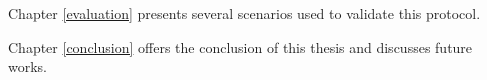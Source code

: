 Chapter \ref{evaluation} presents several scenarios used to validate this protocol.

Chapter \ref{conclusion} offers the conclusion of this thesis and discusses future works.



